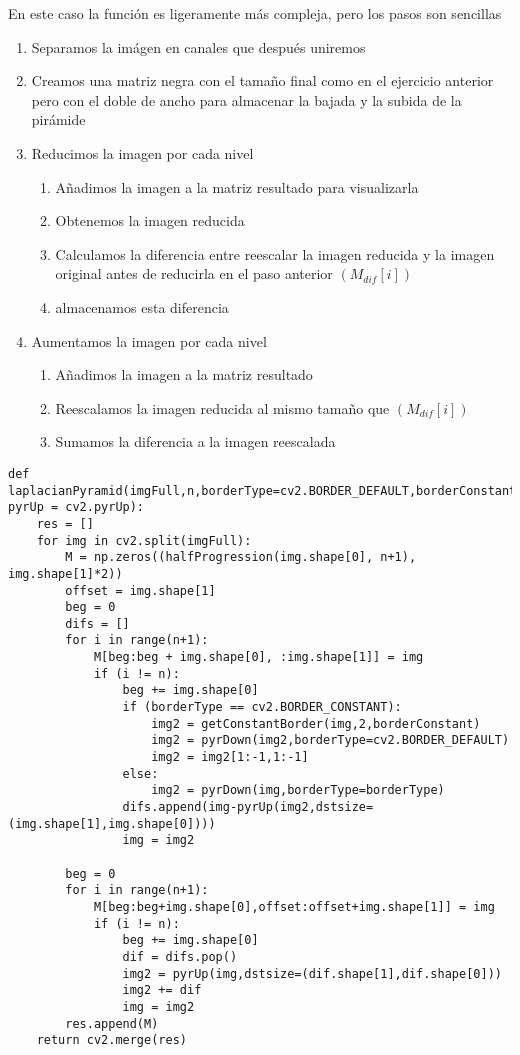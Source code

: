 \documentclass{article}
\begin{document}
En este caso la función es ligeramente más compleja, pero los pasos son sencillas

\begin{enumerate}
\item Separamos la imágen en canales que después uniremos
\item Creamos una matriz negra con el tamaño final como en el ejercicio anterior pero con el doble de ancho para almacenar la bajada y la subida de la pirámide
\item Reducimos la imagen por cada nivel
	\begin{enumerate}
		\item Añadimos la imagen a la matriz resultado para visualizarla
		\item Obtenemos la imagen reducida
		\item Calculamos la diferencia entre reescalar la imagen reducida y la imagen original antes de reducirla en el paso anterior $(M_{dif}[i])$
		\item almacenamos esta diferencia
	\end{enumerate}
\item Aumentamos la imagen por cada nivel
	\begin{enumerate}
		\item Añadimos la imagen a la matriz resultado
		\item Reescalamos la imagen reducida al mismo tamaño que $(M_{dif}[i])$
		\item Sumamos la diferencia a la imagen reescalada
	\end{enumerate}
\end{enumerate}

\begin{lstlisting}
def laplacianPyramid(imgFull,n,borderType=cv2.BORDER_DEFAULT,borderConstant=0.,pyrDown=cv2.pyrDown, pyrUp = cv2.pyrUp):
    res = []
    for img in cv2.split(imgFull):
        M = np.zeros((halfProgression(img.shape[0], n+1), img.shape[1]*2))
        offset = img.shape[1]
        beg = 0
        difs = []
        for i in range(n+1):
            M[beg:beg + img.shape[0], :img.shape[1]] = img
            if (i != n):
                beg += img.shape[0]
                if (borderType == cv2.BORDER_CONSTANT):
                    img2 = getConstantBorder(img,2,borderConstant)
                    img2 = pyrDown(img2,borderType=cv2.BORDER_DEFAULT)
                    img2 = img2[1:-1,1:-1]
                else:
                    img2 = pyrDown(img,borderType=borderType)
                difs.append(img-pyrUp(img2,dstsize=(img.shape[1],img.shape[0])))
                img = img2

        beg = 0
        for i in range(n+1):
            M[beg:beg+img.shape[0],offset:offset+img.shape[1]] = img
            if (i != n):
                beg += img.shape[0]
                dif = difs.pop()
                img2 = pyrUp(img,dstsize=(dif.shape[1],dif.shape[0]))
                img2 += dif
                img = img2
        res.append(M)
    return cv2.merge(res)
\end{lstlisting}
\end{document}
